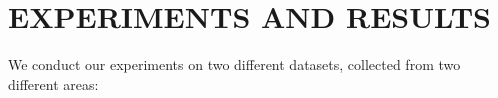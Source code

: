 \documentclass{article}
\newcommand{\x}{\mathbf{x}}
\newcommand{\bea}{\mathbf{b}}
\begin{document}
	\section{EXPERIMENTS AND RESULTS}
	\label{sec:experiments}
	We conduct our experiments on two different datasets, collected from two different areas:  
\end{document}
